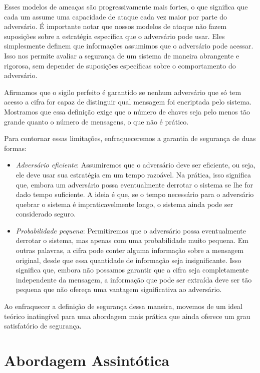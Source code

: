 Esses modelos de ameaças são progressivamente mais fortes, o que significa que cada um assume uma capacidade de ataque cada vez maior por parte do adversário.
É importante notar que nossos modelos de ataque não fazem suposições sobre a estratégia específica que o adversário pode usar.
Eles simplesmente definem que informações assumimos que o adversário pode acessar.
Isso nos permite avaliar a segurança de um sistema de maneira abrangente e rigorosa, sem depender de suposições específicas sobre o comportamento do adversário.

Afirmamos que o sigilo perfeito é garantido se nenhum adversário que só tem acesso a cifra for capaz de distinguir qual mensagem foi encriptada pelo sistema.
Mostramos que essa definição exige que o número de chaves seja pelo menos tão grande quanto o número de mensagens, o que não é prático.

Para contornar essas limitações, enfraqueceremos a garantia de segurança de duas formas:
\begin{itemize}
\item[] {\em Adversário eficiente}:
  Assumiremos que o adversário deve ser eficiente, ou seja, ele deve usar sua estratégia em um tempo razoável.
  Na prática, isso significa que, embora um adversário possa eventualmente derrotar o sistema se lhe for dado tempo suficiente.
  A ideia é que, se o tempo necessário para o adversário quebrar o sistema é impraticavelmente longo, o sistema ainda pode ser considerado seguro.
\item[] {\em Probabilidade pequena}:
  Permitiremos que o adversário possa eventualmente derrotar o sistema, mas apenas com uma probabilidade muito pequena.
  Em outras palavras, a cifra pode conter alguma informação sobre a mensagem original, desde que essa quantidade de informação seja insignificante.
  Isso significa que, embora não possamos garantir que a cifra seja completamente independente da mensagem, a informação que pode ser extraída deve ser tão pequena que não ofereça uma vantagem significativa ao adversário.
\end{itemize}

Ao enfraquecer a definição de segurança dessa maneira, movemos de um ideal teórico inatingível para uma abordagem mais prática que ainda oferece um grau satisfatório de segurança.

\section{Abordagem Assintótica}
\label{sec:abord-assint}

